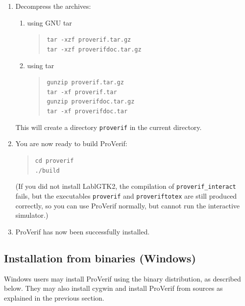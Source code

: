 \documentclass{book}
\begin{document}
\begin{enumerate}
	\item Decompress the archives:
	\begin{enumerate}
		\item using GNU tar
		\begin{quote}
			\texttt{tar -xzf proverif\V.tar.gz}\\
			\texttt{tar -xzf proverifdoc\V.tar.gz}
		\end{quote}
		\item using tar
		\begin{quote}
			\texttt{gunzip proverif\V.tar.gz} \\
			\texttt{tar -xf proverif\V.tar}\\
			\texttt{gunzip proverifdoc\V.tar.gz} \\
			\texttt{tar -xf proverifdoc\V.tar}
		\end{quote}
	\end{enumerate}
	This will create a directory \texttt{proverif\V} in the current directory.

	\item You are now ready to build ProVerif:
	\begin{quote}
		\texttt{cd proverif\V} \\
		\texttt{./build}
	\end{quote}
        (If you did not install LablGTK2, the compilation of
        \texttt{proverif\_interact} fails, but the executables
        \texttt{proverif} and \texttt{proveriftotex} are still
        produced correctly, so you can use ProVerif normally, but cannot
        run the interactive simulator.)

	\item ProVerif has now been successfully installed.
\end{enumerate}

\subsection{Installation from binaries (Windows)}

Windows users may install ProVerif using the binary distribution, as described below. They may also install cygwin and install ProVerif from sources as explained in the previous section.

\end{document}

